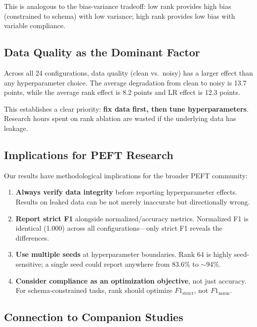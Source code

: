 \documentclass[journal]{IEEEtran}
\begin{document}
This is analogous to the bias-variance tradeoff: low rank provides high bias (constrained to schema) with low variance; high rank provides low bias with variable compliance.

\subsection{Data Quality as the Dominant Factor}
Across all 24 configurations, data quality (clean vs.\ noisy) has a larger effect than any hyperparameter choice. The average degradation from clean to noisy is 13.7 points, while the average rank effect is 8.2 points and LR effect is 12.3 points.

This establishes a clear priority: \textbf{fix data first, then tune hyperparameters}. Research hours spent on rank ablation are wasted if the underlying data has leakage.

\subsection{Implications for PEFT Research}
Our results have methodological implications for the broader PEFT community:
\begin{enumerate}
\item \textbf{Always verify data integrity} before reporting hyperparameter effects. Results on leaked data can be not merely inaccurate but directionally wrong.
\item \textbf{Report strict F1} alongside normalized/accuracy metrics. Normalized F1 is identical (1.000) across all configurations---only strict F1 reveals the differences.
\item \textbf{Use multiple seeds} at hyperparameter boundaries. Rank 64 is highly seed-sensitive; a single seed could report anywhere from 83.6\% to $\sim$94\%.
\item \textbf{Consider compliance as an optimization objective}, not just accuracy. For schema-constrained tasks, rank should optimize $F1_\text{strict}$, not $F1_\text{norm}$.
\end{enumerate}

\subsection{Connection to Companion Studies}
\end{document}
